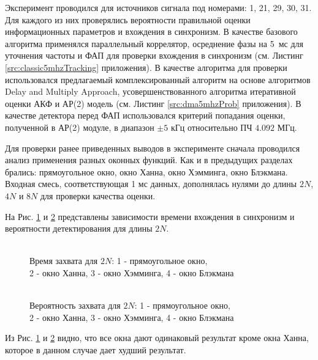 Эксперимент проводился для источников сигнала под номерами: 1, 21, 29, 30, 31. Для каждого из них проверялись вероятности правильной оценки информационных параметров и вхождения в синхронизм.
В качестве базового алгоритма применялся параллельный коррелятор, осреднение фазы на \mbox{5 мс} для уточнения частоты и ФАП для проверки вхождения в синхронизм
(см. Листинг \ref{src:classic5mhzTracking} приложения). В качестве алгоритма для проверки
использовался предлагаемый комплексированный алгоритм на основе алгоритмов Delay and Multiply Approach, усовершенствованного алгоритма итеративной оценки АКФ и
АР(2) модель (см. Листинг \ref{src:dma5mhzProb} приложения).
В качестве детектора перед ФАП использовался критерий попадания оценки, полученной в АР(2) модуле, в диапазон ${\pm 5}$ кГц относительно ПЧ ${4.092}$ МГц. 

Для проверки ранее приведенных выводов в эксперименте сначала проводился анализ применения разных оконных функций. Как и в предыдущих разделах брались: прямоугольное окно,
окно Ханна, окно Хэмминга, окно Блэкмана. Входная смесь, соответствующая 1 мс данных, дополнялась нулями до длины ${2N}$, ${4N}$ и ${8N}$ для проверки качества
оценки.

На Рис. \ref{pic:dma5mhz_2fft_lockTime} и \ref{pic:dma5mhz_2fft_probDetection} представлены зависимости времени вхождения в синхронизм и вероятности детектирования для длины ${2N}$.
\begin{figure}[h]
\center{}
	\caption{\\Время захвата для ${2N}$: 1 - прямоугольное окно,\\2 - окно Ханна, 3 - окно Хэмминга, 4 - окно Блэкмана}
	\label{pic:dma5mhz_2fft_lockTime}
\end{figure}
\begin{figure}[h]
\center{}
	\caption{\\Вероятность захвата для ${2N}$: 1 - прямоугольное окно,\\2 - окно Ханна, 3 - окно Хэмминга, 4 - окно Блэкмана}
	\label{pic:dma5mhz_2fft_probDetection}
\end{figure}
Из Рис. \ref{pic:dma5mhz_2fft_lockTime} и \ref{pic:dma5mhz_2fft_probDetection} видно, что все окна дают одинаковый результат кроме окна Ханна, которое в данном случае дает худший результат.

